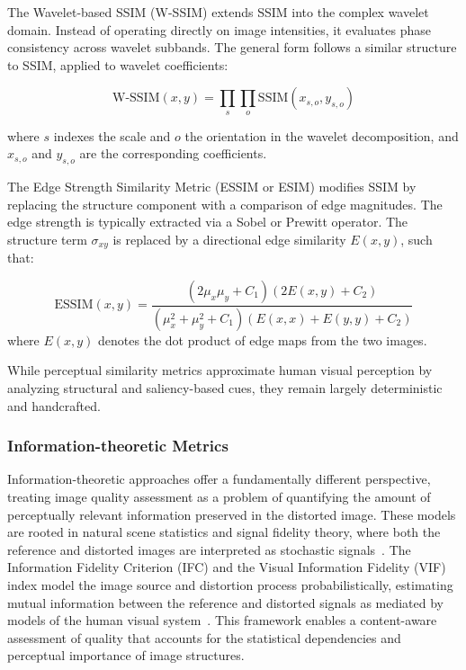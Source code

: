 The Wavelet-based SSIM (W-SSIM) extends SSIM into the complex wavelet domain. Instead of operating directly on image intensities, it evaluates phase consistency across wavelet subbands. The general form follows a similar structure to SSIM, applied to wavelet coefficients:

\begin{equation}
\text{W-SSIM}(x, y) = \prod_{s} \prod_{o} \text{SSIM}(x_{s,o}, y_{s,o})
\end{equation}

where $s$ indexes the scale and $o$ the orientation in the wavelet decomposition, and $x_{s,o}$ and $y_{s,o}$ are the corresponding coefficients.

The Edge Strength Similarity Metric (ESSIM or ESIM) modifies SSIM by replacing the structure component with a comparison of edge magnitudes. The edge strength is typically extracted via a Sobel or Prewitt operator. The structure term $\sigma_{xy}$ is replaced by a directional edge similarity $E(x, y)$, such that:

\begin{equation}
\text{ESSIM}(x, y) = \frac{(2\mu_x \mu_y + C_1)(2E(x, y) + C_2)}{(\mu_x^2 + \mu_y^2 + C_1)(E(x, x) + E(y, y) + C_2)}
\end{equation}
where $E(x, y)$ denotes the dot product of edge maps from the two images.

While perceptual similarity metrics approximate human visual perception by analyzing structural and saliency-based cues, they remain largely deterministic and handcrafted.

\subsubsection{Information-theoretic Metrics}\label{sec:learning_based_metrics}

Information-theoretic approaches offer a fundamentally different perspective, treating image quality assessment as a problem of quantifying the amount of perceptually relevant information preserved in the distorted image. These models are rooted in natural scene statistics and signal fidelity theory, where both the reference and distorted images are interpreted as stochastic signals~\cite{sheikh2005ifc}. The Information Fidelity Criterion (IFC) and the Visual Information Fidelity (VIF) index model the image source and distortion process probabilistically, estimating mutual information between the reference and distorted signals as mediated by models of the human visual system~\cite{Sheikh2006VIF}. This framework enables a content-aware assessment of quality that accounts for the statistical dependencies and perceptual importance of image structures.

